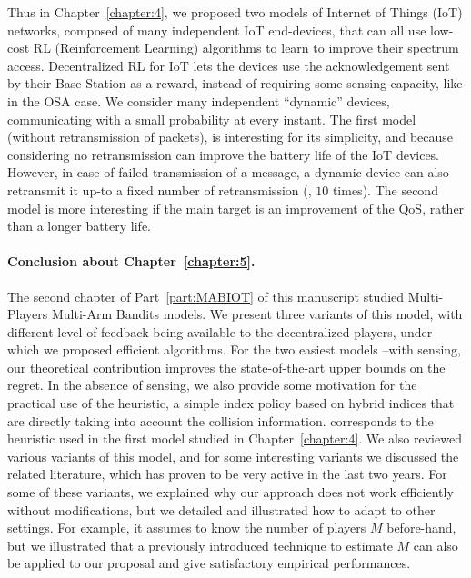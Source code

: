 Thus in Chapter~\ref{chapter:4}, we proposed two models of Internet of Things (IoT) networks, composed of many independent IoT end-devices,
that can all use low-cost RL (Reinforcement Learning) algorithms to learn to improve their spectrum access.
%
Decentralized RL for IoT lets the devices use the acknowledgement sent by their Base Station as a reward, instead of requiring some sensing capacity, like in the OSA case.
We consider many independent ``dynamic'' devices, communicating with a small probability at every instant.
The first model (without retransmission of packets),
is interesting for its simplicity, and because considering no retransmission can improve the battery life of the IoT devices.
%
However, in case of failed transmission of a message, a dynamic device can also retransmit it up-to a fixed number of retransmission (\eg, $10$ times).
%
The second model is more interesting if the main target is an improvement of the QoS, rather than a longer battery life.



\paragraph{Conclusion about \textbf{Chapter~\ref{chapter:5}}.}

The second chapter of Part~\ref{part:MABIOT} of this manuscript studied Multi-Players Multi-Arm Bandits models.
%
We present three variants of this model,
with different level of feedback being available to the decentralized players, under which we proposed efficient algorithms.
For the two easiest models --with sensing, our theoretical contribution improves the state-of-the-art upper bounds on the regret.
In the absence of sensing, we also provide some motivation for the practical use of the \Selfish{} heuristic, a simple index policy based on hybrid indices that are directly taking  into account the collision information.
\Selfish{} corresponds to the heuristic used in the first model studied in Chapter~\ref{chapter:4}.
%
We also reviewed various variants of this model, and for some interesting variants we discussed the related literature, which has proven to be very active in the last two years.
For some of these variants, we explained why our approach does not work efficiently without modifications, but we detailed and illustrated how to adapt \MCTopM{} to other settings.
For example, it assumes to know the number of players $M$ before-hand, but we illustrated that a previously introduced technique to estimate $M$ can also be applied to our proposal and give satisfactory empirical performances.


